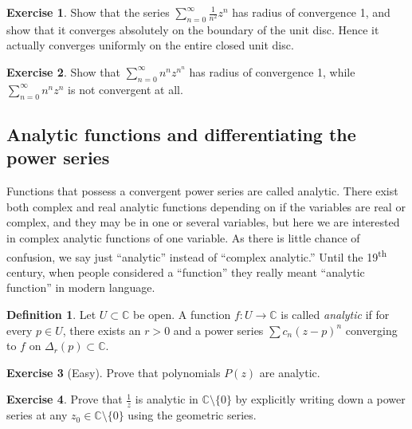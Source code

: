\documentclass[12pt,openany]{book}
\newcommand{\C}{{\mathbb{C}}}
\newcommand{\myindex}[1]{#1\index{#1}}
\theoremstyle{plain}
\theoremstyle{remark}
\theoremstyle{definition}
\newtheorem{defn}[thm]{Definition}
\newenvironment{exbox}{%
    \def\FrameCommand{\vrule width 1pt \relax\hspace {10pt}}%
    \MakeFramed {\advance \hsize -\width \FrameRestore }%
}{%
    \endMakeFramed
}
\theoremstyle{exercise}
\newtheorem{exercise}{Exercise}[section]
\theoremstyle{example}
\begin{document}
\begin{exbox}
\begin{exercise}
Show that the series $\sum_{n=0}^\infty \frac{1}{n^2} z^{n}$ has radius of convergence 1, and
show that it converges absolutely on the boundary of the unit disc.  Hence
it actually converges uniformly on the entire closed unit disc.
\end{exercise}

\begin{exercise}
Show that
$\sum_{n=0}^\infty n^n z^{n^n}$ has radius of convergence 1,
while
$\sum_{n=0}^\infty n^n z^{n}$ is not convergent at all.
\end{exercise}
\end{exbox}

\subsection{Analytic functions and differentiating the power series}

Functions that possess a convergent power series are called analytic.
There exist both complex and real analytic functions depending on if the
variables are real or complex, and they may be in one or several variables,
but here we are interested in complex analytic functions of one variable. 
As there is little chance of confusion, we say just ``analytic'' instead of
``complex analytic.''  Until the 19\textsuperscript{th} century, 
when people considered a ``function'' they really meant ``analytic function''
in modern language.

\begin{defn}
Let $U \subset \C$ be open.  A function $f \colon U \to \C$
is called \emph{\myindex{analytic}}
if for every $p \in U$, there exists 
an $r > 0$ and a
power series $\sum c_n {(z-p)}^n$ converging to $f$ on $\Delta_r(p) \subset
\C$.
\end{defn}

\begin{exbox}
\begin{exercise}[Easy]
Prove that polynomials $P(z)$ are analytic.
\end{exercise}

\begin{exercise}
Prove that $\frac{1}{z}$ is analytic in $\C \setminus \{ 0 \}$
by explicitly writing down 
a power series at any $z_0 \in \C \setminus \{ 0 \}$
using the geometric series.
\end{exercise}
\end{exbox}
\end{document}
